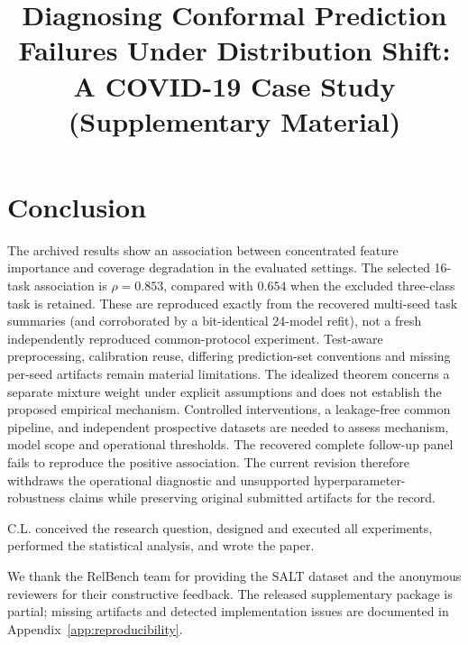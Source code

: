 \documentclass[accepted]{uai2026} %
\begin{document}
\section{Conclusion}\label{sec:conclusion}

The archived results show an association between concentrated feature importance and coverage degradation in the evaluated settings. The selected 16-task association is $\rho=0.853$, compared with $0.654$ when the excluded three-class task is retained. These are reproduced exactly from the recovered multi-seed task summaries (and corroborated by a bit-identical 24-model refit), not a fresh independently reproduced common-protocol experiment. Test-aware preprocessing, calibration reuse, differing prediction-set conventions and missing per-seed artifacts remain material limitations. The idealized theorem concerns a separate mixture weight under explicit assumptions and does not establish the proposed empirical mechanism.
Controlled interventions, a leakage-free common pipeline, and independent prospective datasets are needed to assess mechanism, model scope and operational thresholds. The recovered complete follow-up panel fails to reproduce the positive association. The current revision therefore withdraws the operational diagnostic and unsupported hyperparameter-robustness claims while preserving original submitted artifacts for the record.

\begin{contributions}
    C.L. conceived the research question, designed and executed all experiments, performed the statistical analysis, and wrote the paper.
\end{contributions}

\begin{acknowledgements}
    We thank the RelBench team for providing the SALT dataset and the anonymous reviewers for their constructive feedback. The released supplementary package is partial; missing artifacts and detected implementation issues are documented in Appendix~\ref{app:reproducibility}.
\end{acknowledgements}



\newpage
\onecolumn

\title{Diagnosing Conformal Prediction Failures Under Distribution Shift:\\A COVID-19 Case Study (Supplementary Material)}
\maketitle
\end{document}
